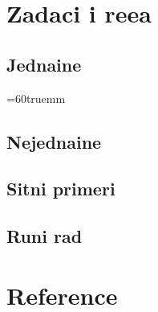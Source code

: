 \documentclass[12pt, twoside, a4paper]{article}
\begin{document}
\section{Zadaci i re{\sv}e{\nj}a}\label{sec:zadaci}

\subsection{Jedna{\cv}ine}

\newdimen\sirina \sirina=60truemm

\def\jed{Jedna{\cv}ina~}










\newpage

\subsection{Nejedna{\cv}ine}






% 

% 


\newpage


\subsection{Sitni primeri}










\newpage

\subsection{Ru{\cv}ni rad}





\vfill



\section{Reference}
\end{document}
